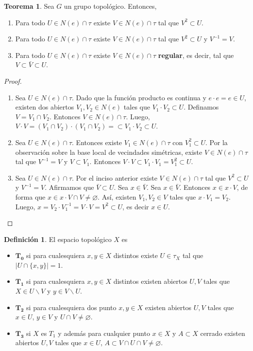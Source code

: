 \documentclass[spanish]{article}
\theoremstyle{definition}
\newtheorem*{defn}{Definición}
\newtheorem*{teo}{Teorema}
\begin{document}
\begin{teo}
	Sea $G$ un grupo topológico. Entonces,
	\begin{enumerate}
		\item Para todo $U\in N(e)\cap\tau$ existe $V\in N(e)\cap\tau$ tal que $V^2\subset U$.
		\item Para todo $U\in N(e)\cap\tau$ existe $V\in N(e)\cap\tau$ tal que $V^2\subset U$ y $V^{-1}=V$.
		\item Para todo $U\in N(e)\cap\tau$ existe $V\in N(e)\cap\tau$ \textbf{regular}, es decir, tal que $V\subset\bar{V}\subset U$.
	\end{enumerate}
\end{teo}
\begin{proof}\leavevmode
	\begin{enumerate}
		\item Sea $U\in N(e)\cap\tau$. Dado que la función producto es continua y $e\cdot e=e\in U$, existen dos abiertos $V_1,V_2\in N(e)$ tales que $V_1\cdot V_2\subset U$. Definamos $V=V_1\cap V_2$. Entonces $V\in N(e)\cap\tau$. Luego, $V\cdot V=(V_1\cap V_2)\cdot(V_1\cap V_2)=\subset V_1\cdot V_2\subset U$.
		\item Sea $U\in N(e)\cap\tau$. Entonces existe $V_1\in N(e)\cap\tau$ con $V_1^2\subset U$. Por la observación sobre la base local de vecindades simétricas, existe $V\in N(e)\cap\tau$ tal que $V^{-1}=V$ y $V\subset V_1$. Entonces $V\cdot V\subset V_1\cdot V_1=V_1^2\subset U$.
		\item Sea $U\in N(e)\cap\tau$. Por el inciso anterior existe $V\in N(e)\cap\tau$ tal que $V^2\subset U$ y $V^{-1}=V$. Afirmamos que $\bar{V}\subset U$. Sea $x\in\bar{V}$. Sea $x\in\bar{V}$. Entonces $x\in x\cdot V$, de forma que $x\in x\cdot V\cap V\neq\varnothing$. Así, existen $V_1,V_2\in V$ tales que $x\cdot V_1=V_2$. Luego, $x=V_2\cdot V_1^{-1}=V\cdot V=V^2\subset U$, es decir $x\in U$.
	\end{enumerate}
\end{proof}
\begin{defn} El espacio topológico $X$ es
	\begin{itemize}
		\item $\mathbf{T_0}$ si para cualesquiera $x,y\in X$ distintos existe $U\in\tau_X$ tal que $|U\cap\{x,y\}|=1$.
		\item $\mathbf{T_1}$ si para cualesquiera $x,y\in X$ distintos existen abiertos $U,V$ tales que $X\in U\backslash V$ y $y\in V\backslash U$.
		\item $\mathbf{T_2}$ si para cualesquiera dos punto $x,y\in X$ existen abiertos $U,V$ tales que $x\in U$, $y\in V$ y $U\cap V\neq\varnothing$.
		\item $\mathbf{T_3}$ si $X$ es $T_1$ y además para cualquier punto $x\in X$ y $A\subset X$ cerrado existen abiertos $U,V$ tales que $x\in U$, $A\subset V\cap U\cap V\neq\varnothing$.
	\end{itemize}
\end{defn}
\end{document}
